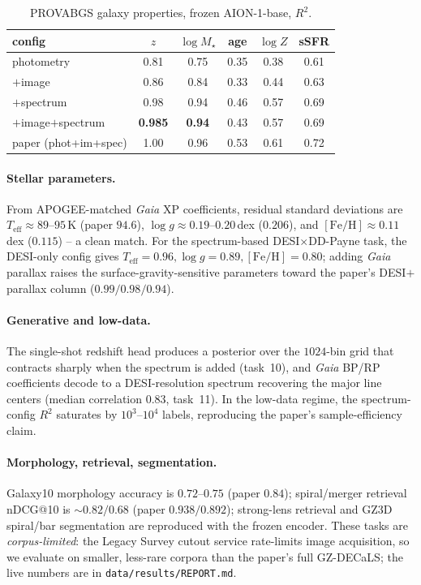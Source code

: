 \documentclass[11pt,letterpaper]{article}
\newcommand{\aion}{\textsc{AION-1}}
\newcommand{\Rsq}{\ensuremath{R^{2}}}
\begin{document}
\begin{table}[h]\centering
\caption{PROVABGS galaxy properties, frozen \aion{}-base, \Rsq{}.}
\label{tab:gal}
\begin{tabular}{lccccc}
\hline
config & $z$ & $\log M_\star$ & age & $\log Z$ & sSFR \\ \hline
photometry          & 0.81 & 0.75 & 0.35 & 0.38 & 0.61 \\
$+$image            & 0.86 & 0.84 & 0.33 & 0.44 & 0.63 \\
$+$spectrum         & 0.98 & 0.94 & 0.46 & 0.57 & 0.69 \\
$+$image$+$spectrum & \textbf{0.985} & \textbf{0.94} & 0.43 & 0.57 & 0.69 \\ \hline
paper (phot+im+spec)& 1.00 & 0.96 & 0.53 & 0.61 & 0.72 \\ \hline
\end{tabular}
\end{table}

\paragraph{Stellar parameters.} From APOGEE-matched \textit{Gaia} XP
coefficients, residual standard deviations are
$T_{\mathrm{eff}}\!\approx\!89$--$95$\,K (paper $94.6$),
$\log g\!\approx\!0.19$--$0.20$\,dex ($0.206$), and
$[\mathrm{Fe/H}]\!\approx\!0.11$\,dex ($0.115$) -- a clean match. For the
spectrum-based DESI$\times$DD-Payne task, the DESI-only config gives
$T_{\mathrm{eff}}=0.96, \log g=0.89, [\mathrm{Fe/H}]=0.80$; adding \textit{Gaia}
parallax raises the surface-gravity-sensitive parameters toward the paper's
DESI$+$parallax column ($0.99/0.98/0.94$).

\paragraph{Generative and low-data.} The single-shot redshift head produces a
posterior over the $1024$-bin grid that contracts sharply when the spectrum is
added (task~10), and \textit{Gaia} BP/RP coefficients decode to a DESI-resolution
spectrum recovering the major line centers (median correlation $0.83$, task~11).
In the low-data regime, the spectrum-config \Rsq{} saturates by $10^3$--$10^4$
labels, reproducing the paper's sample-efficiency claim.

\paragraph{Morphology, retrieval, segmentation.} Galaxy10 morphology accuracy is
$0.72$--$0.75$ (paper $0.84$); spiral/merger retrieval nDCG@10 is
$\sim\!0.82/0.68$ (paper $0.938/0.892$); strong-lens retrieval and GZ3D
spiral/bar segmentation are reproduced with the frozen encoder. These tasks are
\emph{corpus-limited}: the Legacy Survey cutout service rate-limits image
acquisition, so we evaluate on smaller, less-rare corpora than the paper's full
GZ-DECaLS; the live numbers are in \texttt{data/results/REPORT.md}.
\end{document}
